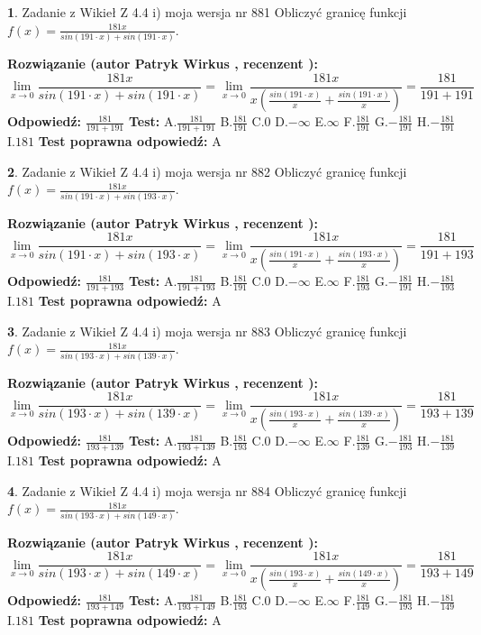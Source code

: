 \documentclass[12pt, a4paper]{article}
\theoremstyle{definition} %
\newtheorem{zad}{}
\newcommand{\zadStart}[1]{\begin{zad}#1\newline}
\newcommand{\zadStop}{\end{zad}}
\newcommand{\rozwStart}[2]{\noindent \textbf{Rozwiązanie (autor #1 , recenzent #2): }\newline}
\newcommand{\rozwStop}{\newline}
\newcommand{\odpStart}{\noindent \textbf{Odpowiedź:}\newline}
\newcommand{\odpStop}{\newline}
\newcommand{\testStart}{\noindent \textbf{Test:}\newline}
\newcommand{\testStop}{\newline}
\newcommand{\kluczStart}{\noindent \textbf{Test poprawna odpowiedź:}\newline}
\newcommand{\kluczStop}{\newline}
\begin{document}
\zadStart{Zadanie z Wikieł Z 4.4 i) moja wersja nr 881}
Obliczyć granicę funkcji $f(x)=\frac{181x}{sin(191\cdot x) +sin(191\cdot x)}$.
\zadStop
\rozwStart{Patryk Wirkus}{}
$$\lim\limits_{x\to 0}\frac{181x}{sin(191\cdot x) +sin(191\cdot x)}=\lim\limits_{x\to 0}\frac{181x}{x(\frac{sin(191\cdot x)}{x}+\frac{sin(191\cdot x)}{x})}=\frac{181}{191+191}$$
\rozwStop
\odpStart
$\frac{181}{191+191}$
\odpStop
\testStart
A.$\frac{181}{191+191}$
B.$\frac{181}{191}$
C.$0$
D.$-\infty$
E.$\infty$
F.$\frac{181}{191}$
G.$-\frac{181}{191}$
H.$-\frac{181}{191}$
I.$181$
\testStop
\kluczStart
A
\kluczStop



\zadStart{Zadanie z Wikieł Z 4.4 i) moja wersja nr 882}
Obliczyć granicę funkcji $f(x)=\frac{181x}{sin(191\cdot x) +sin(193\cdot x)}$.
\zadStop
\rozwStart{Patryk Wirkus}{}
$$\lim\limits_{x\to 0}\frac{181x}{sin(191\cdot x) +sin(193\cdot x)}=\lim\limits_{x\to 0}\frac{181x}{x(\frac{sin(191\cdot x)}{x}+\frac{sin(193\cdot x)}{x})}=\frac{181}{191+193}$$
\rozwStop
\odpStart
$\frac{181}{191+193}$
\odpStop
\testStart
A.$\frac{181}{191+193}$
B.$\frac{181}{191}$
C.$0$
D.$-\infty$
E.$\infty$
F.$\frac{181}{193}$
G.$-\frac{181}{191}$
H.$-\frac{181}{193}$
I.$181$
\testStop
\kluczStart
A
\kluczStop



\zadStart{Zadanie z Wikieł Z 4.4 i) moja wersja nr 883}
Obliczyć granicę funkcji $f(x)=\frac{181x}{sin(193\cdot x) +sin(139\cdot x)}$.
\zadStop
\rozwStart{Patryk Wirkus}{}
$$\lim\limits_{x\to 0}\frac{181x}{sin(193\cdot x) +sin(139\cdot x)}=\lim\limits_{x\to 0}\frac{181x}{x(\frac{sin(193\cdot x)}{x}+\frac{sin(139\cdot x)}{x})}=\frac{181}{193+139}$$
\rozwStop
\odpStart
$\frac{181}{193+139}$
\odpStop
\testStart
A.$\frac{181}{193+139}$
B.$\frac{181}{193}$
C.$0$
D.$-\infty$
E.$\infty$
F.$\frac{181}{139}$
G.$-\frac{181}{193}$
H.$-\frac{181}{139}$
I.$181$
\testStop
\kluczStart
A
\kluczStop



\zadStart{Zadanie z Wikieł Z 4.4 i) moja wersja nr 884}
Obliczyć granicę funkcji $f(x)=\frac{181x}{sin(193\cdot x) +sin(149\cdot x)}$.
\zadStop
\rozwStart{Patryk Wirkus}{}
$$\lim\limits_{x\to 0}\frac{181x}{sin(193\cdot x) +sin(149\cdot x)}=\lim\limits_{x\to 0}\frac{181x}{x(\frac{sin(193\cdot x)}{x}+\frac{sin(149\cdot x)}{x})}=\frac{181}{193+149}$$
\rozwStop
\odpStart
$\frac{181}{193+149}$
\odpStop
\testStart
A.$\frac{181}{193+149}$
B.$\frac{181}{193}$
C.$0$
D.$-\infty$
E.$\infty$
F.$\frac{181}{149}$
G.$-\frac{181}{193}$
H.$-\frac{181}{149}$
I.$181$
\testStop
\kluczStart
A
\kluczStop
\end{document}
